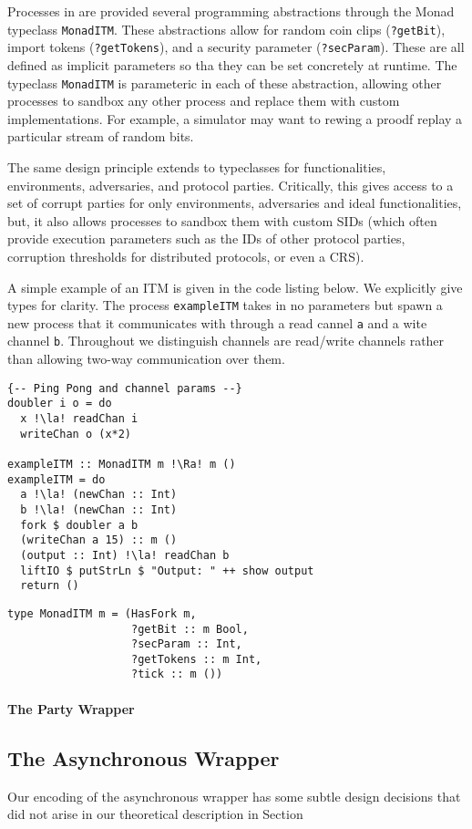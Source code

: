 Processes in \us are provided several programming abstractions through the Monad typeclass \texttt{MonadITM}. 
These abstractions allow for random coin clips (\texttt{?getBit}), import tokens (\texttt{?getTokens}), and a security parameter (\texttt{?secParam}).
These are all defined as implicit parameters so tha they can be set concretely at runtime. 
The typeclass \texttt{MonadITM} is parameteric in each of these abstraction, allowing other processes to sandbox any other process and replace them with custom implementations.
For example, a simulator may want to rewing a proodf replay a particular stream of random bits.

The same design principle extends to typeclasses for functionalities, environments, adversaries, and protocol parties. 
Critically, this gives access to a set of corrupt parties for only environments, adversaries and ideal functionalities, but, it also allows processes to sandbox them with custom SIDs (which often provide execution parameters such as the IDs of other protocol parties, corruption thresholds for distributed protocols, or even a CRS).


A simple example of an ITM is given in the code listing below. We explicitly give types for clarity.
The process \texttt{exampleITM} takes in no parameters but spawn a new process that it communicates with through a read cannel \texttt{a} and a wite channel \texttt{b}.
Throughout \us we distinguish channels are read/write channels rather than allowing two-way communication over them. 

\begin{lstlisting}
{-- Ping Pong and channel params --}
doubler i o = do
  x !\la! readChan i
  writeChan o (x*2)

exampleITM :: MonadITM m !\Ra! m ()
exampleITM = do
  a !\la! (newChan :: Int)
  b !\la! (newChan :: Int)
  fork $ doubler a b
  (writeChan a 15) :: m ()
  (output :: Int) !\la! readChan b
  liftIO $ putStrLn $ "Output: " ++ show output
  return ()
\end{lstlisting}

\begin{lstlisting}
type MonadITM m = (HasFork m,
                   ?getBit :: m Bool,
                   ?secParam :: Int,
                   ?getTokens :: m Int,
                   ?tick :: m ())
\end{lstlisting}

\paragraph{The Party Wrapper}

\subsection{The Asynchronous Wrapper}
Our encoding of the asynchronous wrapper has some subtle design decisions that did not arise in our theoretical description in Section
